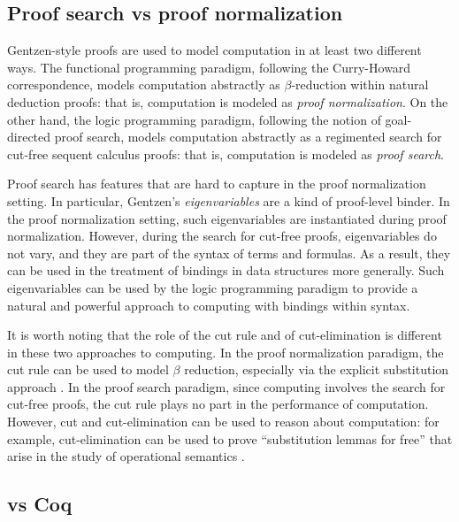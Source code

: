 \subsection{Proof search vs proof normalization}

Gentzen-style proofs are used to model computation in at least two
different ways.  The functional programming paradigm, following the
Curry-Howard correspondence, models computation abstractly as
$\beta$-reduction within natural deduction proofs: that is,
computation is modeled as \emph{proof normalization}.  On the other
hand, the logic programming paradigm, following the notion of
goal-directed proof search, models computation abstractly as a
regimented search for cut-free sequent calculus proofs: that is,
computation is modeled as \emph{proof search}.

Proof search has features that are hard to capture in the proof
normalization setting.  In particular, Gentzen's \emph{eigenvariables}
are a kind of proof-level binder.  In the proof normalization setting,
such eigenvariables are instantiated during proof normalization.
However, during the search for cut-free proofs, eigenvariables do not
vary, and they are part of the syntax of terms and formulas.  As a
result, they can be used in the treatment of bindings in data
structures more generally.  Such eigenvariables can be used by the
logic programming paradigm to provide a natural and powerful
approach to computing with bindings within syntax.

It is worth noting that the role of the cut rule and of
cut-elimination is different in these two approaches to computing.
In the proof normalization paradigm, the cut rule can be used to model
$\beta$ reduction, especially via the explicit substitution approach
\cite{lengrand06phd}. In the proof search paradigm, since computing involves
the search for cut-free proofs, the cut rule plays no part in the
performance of computation.  However, cut and cut-elimination can be
used to reason about computation: for example, cut-elimination can be
used to prove ``substitution lemmas for free'' that arise in the study
of operational semantics \cite{gacek12jar}.

\subsection{\lP vs Coq}

